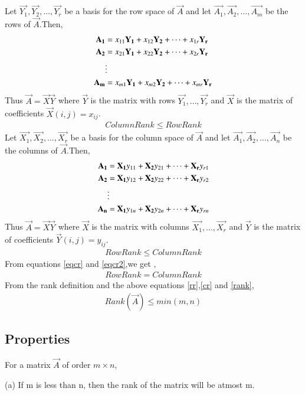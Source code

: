 \documentclass[journal,12pt,twocolumn]{IEEEtran}
\begin{document}
Let $\vec{Y_1},\vec{Y_2},\dots,\vec{Y_r}$ be a basis for the row space of $\vec{A}$ and let $\vec{A_1},\vec{A_2},\dots,\vec{A_m}$ be the rows of $\vec{A}$.Then,
\begin{align}
    \vec{A_1}&=x_{11}\vec{Y_1}+x_{12}\vec{Y_2}+\dots+x_{1r}\vec{Y_r}\notag \\
\vec{A_2}&=x_{21}\vec{Y_1}+x_{22}\vec{Y_2}+\dots+x_{2r}\vec{Y_r}\notag \\
&\vdots \notag\\
\vec{A_m}&=x_{m1}\vec{Y_1}+x_{m2}\vec{Y_2}+\dots+x_{mr}\vec{Y_r}\notag 
\end{align}
Thus $\vec{A}=\vec{X}\vec{Y}$ where $\vec{Y}$ is the matrix with rows $\vec{Y_1},\dots,\vec{Y_r}$ and $\vec{X}$ is the matrix of coefficients $\vec{X}(i,j)=x_{ij}$.
\begin{align}
Column Rank \leq Row Rank \label{eqcr}
\end{align}
Let $\vec{X_1},\vec{X_2},\dots,\vec{X_r}$ be a basis for the column space of $\vec{A}$ and let $\vec{A_1},\vec{A_2},\dots,\vec{A_n}$ be the columns of $\vec{A}$.Then,
\begin{align}
    \vec{A_1}&=\vec{X_1}y_{11}+\vec{X_2}y_{21}+\dots+\vec{X_r}y_{r1}\notag \\
\vec{A_2}&=\vec{X_1}y_{12}+\vec{X_2}y_{22}+\dots+\vec{X_r}y_{r2}\notag \\
&\vdots \notag\\
\vec{A_n}&=\vec{X_1}y_{1n}+\vec{X_2}y_{2n}+\dots+\vec{X_r}y_{rn}\notag 
\end{align}
Thus $\vec{A}=\vec{X}\vec{Y}$ where $\vec{X}$ is the matrix with columns $\vec{X_1},\dots,\vec{X_r}$ and $\vec{Y}$ is the matrix of coefficients $\vec{Y}(i,j)=y_{ij}$.
\begin{align}
Row Rank \leq Column Rank \label{eqcr2}
\end{align}
From equations \eqref{eqcr} and \eqref{eqcr2},we get , 
\begin{align}
    Row Rank = Column Rank \label{rank}
\end{align}
From the rank definition and the above equations \eqref{rr},\eqref{cr} and \eqref{rank},
\begin{align}
    Rank(\vec{A})\leq min(m,n)\label{main}
\end{align}
\subsection{Properties}
For a matrix $\vec{A}$ of order $m\times n$,

(a) If m is less than n, then the rank of the matrix will be atmost m.
\end{document}
